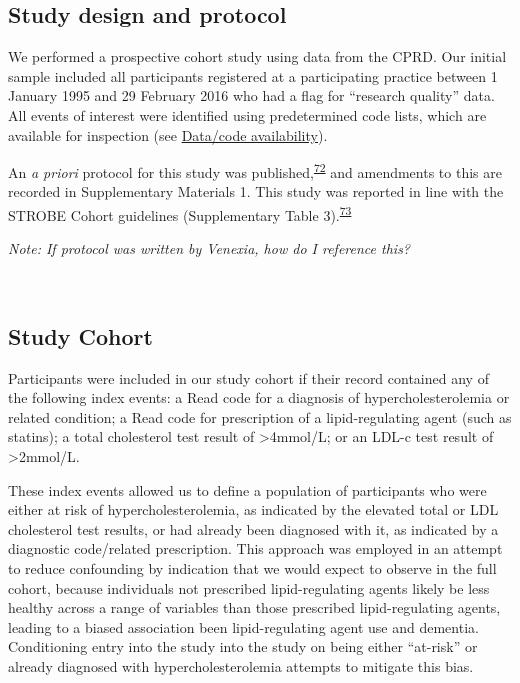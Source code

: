\documentclass[a4paper, twoside]{templates/ociamthesis}
\begin{document}
\hypertarget{study-design-and-protocol}{%
\subsection{Study design and protocol}\label{study-design-and-protocol}}

We performed a prospective cohort study using data from the CPRD. Our initial sample included all participants registered at a participating practice between 1 January 1995 and 29 February 2016 who had a flag for ``research quality'' data. All events of interest were identified using predetermined code lists, which are available for inspection (see \protect\hyperlink{data-code-avail}{Data/code availability}).

An \emph{a priori} protocol for this study was published,\textsuperscript{\protect\hyperlink{ref-walker2016a}{72}} and amendments to this are recorded in Supplementary Materials 1. This study was reported in line with the STROBE Cohort guidelines (Supplementary Table 3).\textsuperscript{\protect\hyperlink{ref-vonelm2008}{73}}

\emph{Note: If protocol was written by Venexia, how do I reference this?}

~

\hypertarget{study-cohort}{%
\subsection{Study Cohort}\label{study-cohort}}

Participants were included in our study cohort if their record contained any of the following index events: a Read code for a diagnosis of hypercholesterolemia or related condition; a Read code for prescription of a lipid-regulating agent (such as statins); a total cholesterol test result of \textgreater4mmol/L; or an LDL-c test result of \textgreater2mmol/L.

These index events allowed us to define a population of participants who were either at risk of hypercholesterolemia, as indicated by the elevated total or LDL cholesterol test results, or had already been diagnosed with it, as indicated by a diagnostic code/related prescription. This approach was employed in an attempt to reduce confounding by indication that we would expect to observe in the full cohort, because individuals not prescribed lipid-regulating agents likely be less healthy across a range of variables than those prescribed lipid-regulating agents, leading to a biased association been lipid-regulating agent use and dementia. Conditioning entry into the study into the study on being either ``at-risk'' or already diagnosed with hypercholesterolemia attempts to mitigate this bias.
\end{document}
